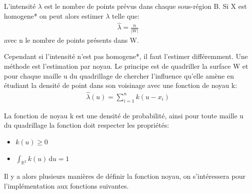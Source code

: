 \documentclass[stage2a]{tnreport}
\begin{document}
L'intensité \begin{math}\lambda\end{math} est le nombre de points prévus dans chaque sous-région B. Si X est \gls{homogene}* on peut alors estimer \begin{math}\lambda\end{math} telle que:
\begin{align*}
    \hat{\lambda} = \frac{n}{|W|}
\end{align*}
avec n le nombre de points présents dans W.

Cependant si l'intensité n'est pas \gls{homogene}*, il faut l'estimer différemment. Une méthode est l'estimation par noyau. Le principe est de quadriller la surface W et pour chaque maille u du quadrillage de chercher l'influence qu'elle amène en étudiant la densité de point dans son voisinage avec une fonction de noyau k:
\begin{align*}
    \hat{\lambda}(u) = \sum_{i=1}^n k(u-x_i)
\end{align*}

La fonction de noyau k est une densité de probabilité, ainsi pour toute maille u du quadrillage la fonction doit respecter les propriétés:
\begin{center}
\begin{minipage}{5cm}
\begin{itemize}[label=\textbullet]
    \item \begin{math} k(u) \geq 0 \end{math}
    \item \begin{math} \int_{\mathbb{R}^2} k(u) \, \mathrm du = 1\end{math}
\end{itemize}
\end{minipage}
\end{center}
Il y a alors plusieurs manières de définir la fonction noyau, on s'intéressera pour l'implémentation aux fonctions suivantes.
\end{document}
